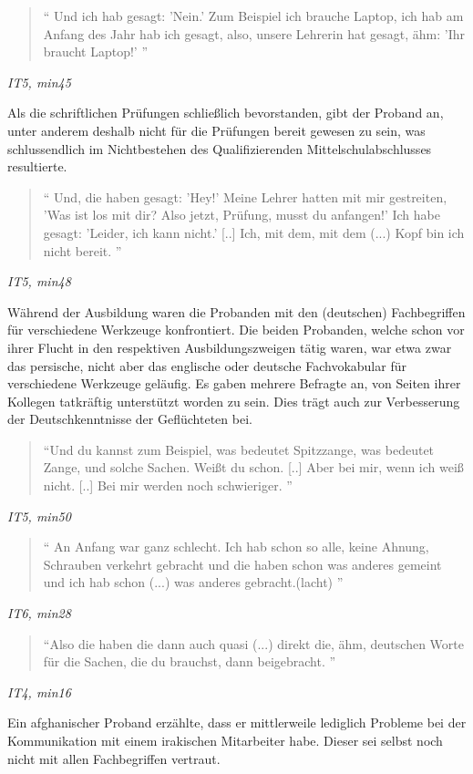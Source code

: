 \begin{quote}
    `` Und ich hab gesagt: 'Nein.' Zum Beispiel ich brauche Laptop, ich hab am Anfang des Jahr hab ich gesagt, also, unsere Lehrerin hat gesagt, ähm: 'Ihr braucht Laptop!' ''
\end{quote}
\centerline{\textit{IT5, min45}}
Als die schriftlichen Prüfungen schließlich bevorstanden, gibt der Proband an, unter anderem deshalb nicht für die Prüfungen bereit gewesen zu sein, was schlussendlich im Nichtbestehen des Qualifizierenden Mittelschulabschlusses resultierte.
\begin{quote}
    ``  Und, die haben gesagt: 'Hey!' Meine Lehrer hatten mit mir gestreiten, 'Was ist los mit dir? Also jetzt, Prüfung, musst du anfangen!' Ich habe gesagt: 'Leider, ich kann nicht.' [..] Ich, mit dem, mit dem (...) Kopf bin ich nicht bereit. ''
\end{quote}
\centerline{\textit{IT5, min48}}
Während der Ausbildung waren die Probanden mit den (deutschen) Fachbegriffen für verschiedene Werkzeuge konfrontiert. Die beiden Probanden, welche schon vor ihrer Flucht in den respektiven Ausbildungszweigen tätig waren, war etwa zwar das persische, nicht aber das englische oder deutsche Fachvokabular für verschiedene Werkzeuge geläufig. Es gaben mehrere Befragte an, von Seiten ihrer Kollegen tatkräftig unterstützt worden zu sein. Dies trägt auch zur Verbesserung der Deutschkenntnisse der Geflüchteten bei.
 
\begin{quote}
    ``Und du kannst zum Beispiel, was bedeutet Spitzzange, was bedeutet Zange, und solche Sachen. Weißt du schon. [..]  Aber bei mir, wenn ich weiß nicht. [..] Bei mir werden noch schwieriger. ''
\end{quote}
\centerline{\textit{IT5, min50}}
\begin{quote}
    `` An Anfang war ganz schlecht. Ich hab schon so alle, keine Ahnung, Schrauben verkehrt gebracht und die haben schon was anderes gemeint und ich hab schon (...) was anderes gebracht.(lacht) ''
\end{quote}
\centerline{\textit{IT6, min28}}
\begin{quote}
    ``Also die haben die dann auch quasi (...) direkt die, ähm, deutschen Worte für die Sachen, die du brauchst, dann beigebracht. ''
\end{quote}
\centerline{\textit{IT4, min16}}

Ein afghanischer Proband erzählte, dass er mittlerweile lediglich Probleme bei der Kommunikation mit einem irakischen Mitarbeiter habe. Dieser sei selbst noch nicht mit allen Fachbegriffen vertraut.

